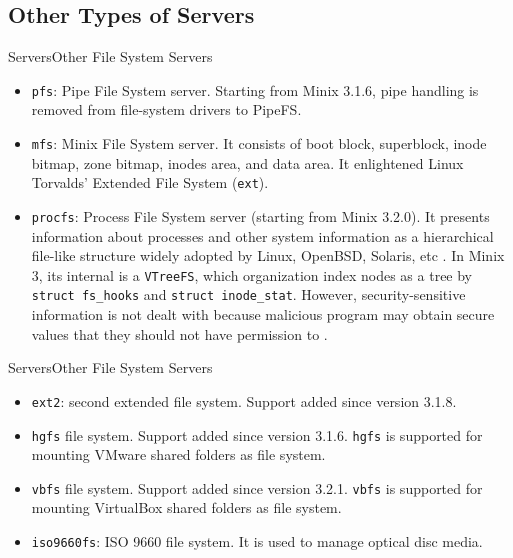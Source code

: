 \documentclass[12pt]{beamer}
\begin{document}
\subsection{Other Types of Servers}
\begin{frame}{Servers}{Other File System Servers}
\begin{itemize}
   \item \texttt{pfs}: Pipe File System server. Starting from Minix 3.1.6, pipe handling is removed from file-system drivers to PipeFS.
    \item \texttt{mfs}: Minix File System server. It consists of boot block, superblock, inode bitmap, zone bitmap, inodes area, and data area. It enlightened Linux Torvalds' Extended File System (\texttt{ext}).
    \item \texttt{procfs}: Process File System server (starting from Minix 3.2.0). It presents information about processes and other system information as a hierarchical file-like structure widely adopted by Linux, OpenBSD, Solaris, etc \cite{procfswikipedia}. In Minix 3, its internal is a \texttt{VTreeFS}, which organization index nodes as a tree by \texttt{struct fs\_hooks} and \texttt{struct inode\_stat}. However, security-sensitive information is not dealt with because malicious program may obtain secure values that they should not have permission to \cite{procfsnotes}.
\end{itemize}
\end{frame}
\begin{frame}{Servers}{Other File System Servers}
\begin{itemize}
    \item \texttt{ext2}: second extended file system. Support added since version 3.1.8.
    \item \texttt{hgfs} file system. Support added since version 3.1.6. \texttt{hgfs} is supported for mounting VMware shared folders as file system.
    \item \texttt{vbfs} file system. Support added since version 3.2.1. \texttt{vbfs} is supported for mounting VirtualBox shared folders as file system.
    \item \texttt{iso9660fs}: ISO 9660 file system. It is used to manage optical disc media.
\end{itemize}
\end{frame}
\end{document}
